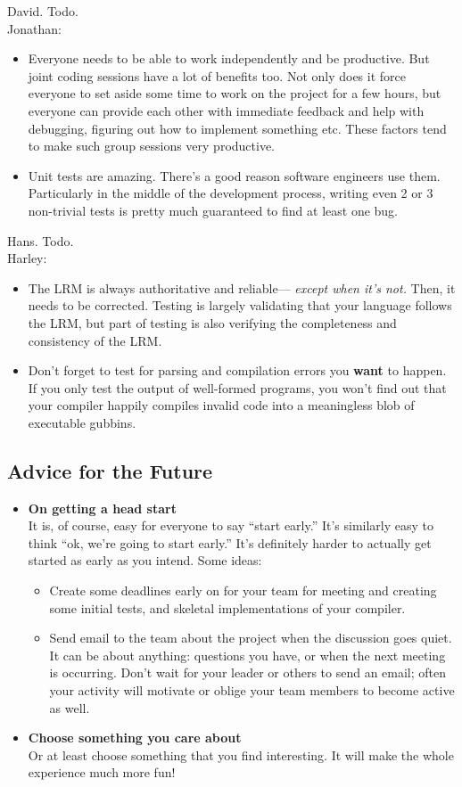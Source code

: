 David. Todo.\\

Jonathan:
\begin{itemize}
\item Everyone needs to be able to work independently and be productive. But joint coding sessions have a lot of benefits too. Not only does it force everyone to set aside some time to work on the project for a few hours, but everyone can provide each other with immediate feedback and help with debugging, figuring out how to implement something etc. These factors tend to make such group sessions very productive. 
\item Unit tests are amazing. There's a good reason software engineers use them. Particularly in the middle of the development process, writing even 2 or 3 non-trivial tests is pretty much guaranteed to find at least one bug. 
\end{itemize}

Hans. Todo.\\

Harley:
\begin{itemize}
\item The LRM is always authoritative and reliable--- {\it except when it's not.} Then, it needs to be corrected. Testing is largely validating that your language follows the LRM, but part of testing is  also verifying the completeness  and consistency of the LRM. 
\item Don't forget to test for parsing and compilation errors you {\bf want} to happen. If you only test the output of well-formed programs, you won't find out that your compiler happily compiles invalid code into a meaningless blob of executable gubbins.
\end{itemize}

\subsection{Advice for the Future}
\begin{itemize}
\item {\bf On getting a head start}\\
It is, of course, easy for everyone to say ``start early.'' It's similarly easy to think ``ok, we're going to start early.''  It's definitely harder to actually get started as early as you intend. Some ideas:
\begin{itemize}
\item Create some deadlines early on for your team for meeting and creating some initial tests, and skeletal implementations of your compiler. 
\item Send email to the  team about the project when the discussion goes quiet. It can be about anything: questions you have, or when the next meeting is occurring. Don't wait for your leader or others to send an email; often your activity will motivate or oblige your team members to become active as well.
\end{itemize}
\item {\bf Choose something you care about}\\
Or at least choose something that you find interesting. It will make the whole experience much more fun!
\end{itemize}